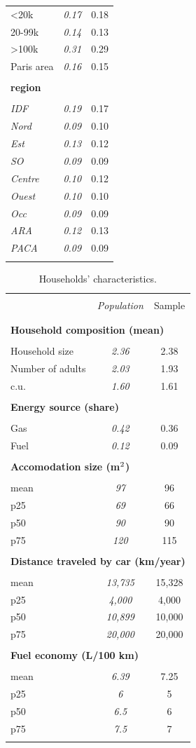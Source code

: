 \documentclass[english,5p,authoryear]{elsarticle}
\begin{document}
\begin{appendices}
\begin{table}[!htbp]
\begin{tabular}{lcc}
<20k & \emph{0.17} & 0.18\tabularnewline
20-99k & \emph{0.14} & 0.13\tabularnewline
>100k & \emph{0.31} & 0.29\tabularnewline
Paris area & \emph{0.16} & 0.15\tabularnewline
\hline  \\[-1.8ex]
\textbf{region} &  & \tabularnewline  \\[-1.8ex]
\emph{IDF} & \emph{0.19} & 0.17\tabularnewline
 \emph{Nord} & \emph{0.09} & 0.10\tabularnewline
 \emph{Est} & \emph{0.13} & 0.12\tabularnewline
\emph{SO} & \emph{0.09} & 0.09\tabularnewline
\emph{Centre} & \emph{0.10} & 0.12\tabularnewline
 \emph{Ouest} & \emph{0.10} & 0.10\tabularnewline
 \emph{Occ} & \emph{0.09} & 0.09\tabularnewline
\emph{ARA} & \emph{0.12} & 0.13\tabularnewline
\emph{PACA} & \emph{0.09} & 0.09\tabularnewline  \\[-1.8ex]
\hline \hline 
\end{tabular}\bigskip{}
\end{table}


\begin{table}[!htbp]
    \caption{Households' characteristics.\label{tab:app-energetic-characs}}
\centering
\begin{tabular}{lcc}
\hline \hline  \\[-1.8ex]
 & \emph{Population} & Sample  \tabularnewline \\[-1.8ex]
\hline  \\[-1.8ex]
\multicolumn{3}{l}{\textbf{Household composition (mean)}} \tabularnewline  \\[-1.8ex]
Household size & \emph{2.36} & 2.38\tabularnewline
Number of adults & \emph{2.03} & 1.93\tabularnewline
c.u. & \emph{1.60} & 1.61\tabularnewline
\hline   \\[-1.8ex]
\multicolumn{3}{l}{\textbf{Energy source (share)}} \tabularnewline  \\[-1.8ex]
Gas & \emph{0.42} & 0.36\tabularnewline
Fuel & \emph{0.12} & 0.09\tabularnewline
\hline   \\[-1.8ex]
\multicolumn{3}{l}{\textbf{Accomodation size (m$^\textnormal{2}$)}} \tabularnewline  \\[-1.8ex]
mean & \emph{97} & 96\tabularnewline
p25 & \emph{69} & 66\tabularnewline
p50 & \emph{90} & 90\tabularnewline
p75 & \emph{120} & 115\tabularnewline
\hline   \\[-1.8ex]
\multicolumn{3}{l}{\textbf{Distance traveled by car (km/year)}} \tabularnewline  \\[-1.8ex]
mean & \emph{13,735} & 15,328\tabularnewline
p25 & \emph{4,000} & 4,000\tabularnewline
p50 & \emph{10,899} & 10,000 \tabularnewline
p75 & \emph{20,000 } & 20,000 \tabularnewline
\hline   \\[-1.8ex]
\multicolumn{3}{l}{\textbf{Fuel economy (L/100 km)}} \tabularnewline  \\[-1.8ex]
mean & \emph{6.39} & 7.25\tabularnewline
p25 & \emph{6} & 5\tabularnewline
p50 & \emph{6.5} & 6\tabularnewline
p75 & \emph{7.5} & 7\tabularnewline  \\[-1.8ex]
\hline \hline 
\end{tabular}\bigskip{}


\end{table}
\end{appendices}
\end{document}
